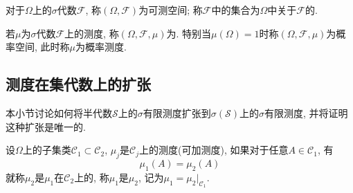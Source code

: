 对于$\Omega$上的$\sigma$代数$\mathscr{F}$, 称$(\Omega,\mathscr{F})$为可测空间; 称$\mathscr{F}$中的集合为$\Omega$中关于$\mathscr{F}$的.

若$\mu$为$\sigma$代数$\mathscr{F}$上的测度, 称$(\Omega,\mathscr{F},\mu)$为. 特别当$\mu(\Omega) = 1$时称$(\Omega,\mathscr{F},\mu)$为概率空间, 此时称$\mu$为概率测度.

\subsection{测度在集代数上的扩张}
本小节讨论如何将半代数$\mathscr{S}$上的$\sigma$有限测度扩张到$\sigma(\mathscr{S})$上的$\sigma$有限测度, 并将证明这种扩张是唯一的.
\begin{definition}
	设$\Omega$上的子集类$\mathscr{C}_1\subset\mathscr{C}_2$, $\mu_j$是$\mathscr{C}_j$上的测度(可加测度), 如果对于任意$A\in\mathscr{C}_1$, 有
	\begin{equation}
		\mu_1(A) = \mu_2(A)
	\end{equation}
	就称$\mu_2$是$\mu_1$在$\mathscr{C}_2$上的, 称$\mu_1$是$\mu_2$, 记为$\mu_1 = \mu_2\bigg\vert_{\mathscr{C}_1}$.
\end{definition}

